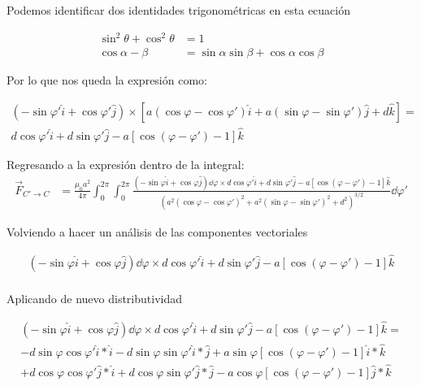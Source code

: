 \documentclass[11pt]{report}
\theoremstyle{plain}
\theoremstyle{definition}
\begin{document}
	Podemos identificar dos identidades trigonométricas en esta ecuación
	
	\begin{align*}%
		\sin^2{\theta} + \cos^2{\theta} &= 1\\
		\cos{\alpha - \beta} &= \sin{\alpha }\sin{\beta}+\cos{\alpha }\cos{\beta}
	\end{align*}
	
	Por lo que nos queda la expresión como:
	
	\begin{align*} %
		\left(-\sin\varphi'\hat{i} + \cos\varphi'\hat{j}\right) \times \left[a(\cos\varphi-\cos\varphi')\hat{i} + a(\sin\varphi-\sin\varphi')\hat{j} + d\hat{k} \right] =\\
		d\cos\varphi'\hat{i}+d\sin\varphi'\hat{j}-a\left[\cos{(\varphi-\varphi')}-1\right]\hat{k}
	\end{align*}
	
	Regresando a la expresión dentro de la integral:
	\begin{align*}%
		\vec{F}_{C'\rightarrow C}&= \frac{\mu_0a^2}{4\pi}\int_0^{2\pi}\int_0^{2\pi}\frac{\left(-\sin\varphi\hat{i} + \cos\varphi\hat{j}\right)\dd{\varphi} \times d\cos\varphi'\hat{i}+d\sin\varphi'\hat{j}-a\left[\cos{(\varphi-\varphi')}-1\right]\hat{k}}{\left(a^2(\cos\varphi-\cos\varphi')^2 + a^2(\sin\varphi-\sin\varphi')^2 + d^2\right)^{3/2}}\dd{\varphi'}
	\end{align*}
	
	Volviendo a hacer un análisis de las componentes vectoriales
	
	\begin{align*}%
		\left(-\sin\varphi\hat{i} + \cos\varphi\hat{j}\right)\dd{\varphi} \times d\cos\varphi'\hat{i}+d\sin\varphi'\hat{j}-a\left[\cos{(\varphi-\varphi')}-1\right]\hat{k}\\
	\end{align*}
	
	Aplicando de nuevo distributividad
	
	\begin{align*}%
		\left(-\sin\varphi\hat{i} + \cos\varphi\hat{j}\right)\dd{\varphi} \times d\cos\varphi'\hat{i}+d\sin\varphi'\hat{j}-a\left[\cos{(\varphi-\varphi')}-1\right]\hat{k} = \\
		-d\sin\varphi \cos\varphi'\hat{i} * \hat{i} -d\sin\varphi\sin\varphi'\hat{i}*\hat{j}+ a\sin\varphi\left[\cos{(\varphi-\varphi')}-1\right]\hat{i}*\hat{k}\\
		+d\cos\varphi\cos\varphi'\hat{j}*\hat{i} + d\cos\varphi\sin\varphi'\hat{j}*\hat{j} - a\cos\varphi\left[\cos{(\varphi-\varphi')}-1\right]\hat{j}*\hat{k}
	\end{align*}
	
\end{document}
